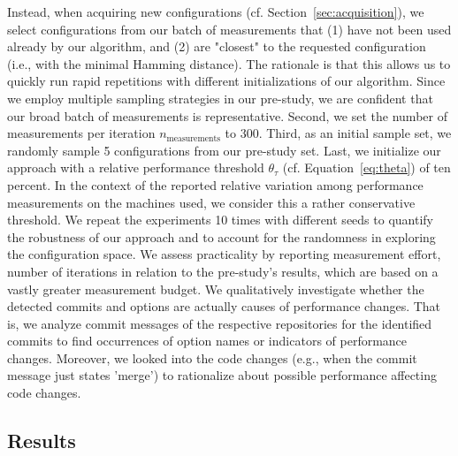 \documentclass[sigconf, screen]{acmart}
\begin{document}
	Instead, when acquiring new configurations (cf. Section~\ref{sec:acquisition}), we select configurations from our batch of measurements that (1) have not been used already by our algorithm, and (2) are "closest" to the requested configuration (i.e., with the minimal Hamming distance). The rationale is that this allows us to quickly run rapid repetitions with different initializations of our algorithm. Since we employ multiple sampling strategies in our pre-study, we are confident that our broad batch of measurements is representative. Second, we set the number of measurements per iteration $n_\text{measurements}$ to 300. Third, as an initial sample set, we randomly sample 5 configurations from our pre-study set. 
	Last, we initialize our approach with a relative performance threshold $\theta_\tau$ (cf. Equation~\ref{eq:theta}) of ten percent. In the context of the reported relative variation among performance measurements on the machines used, we consider this a rather conservative threshold. 
	We repeat the experiments 10 times with different seeds to quantify the robustness of our approach and to account for the randomness in exploring the configuration space.
	We assess practicality by reporting measurement effort, number of iterations in relation to the pre-study's results, which are based on a vastly greater measurement budget.
	We qualitatively investigate whether the detected commits and options are actually causes of performance changes. That is, we analyze commit messages of the respective repositories for the identified commits to find occurrences of option names or indicators of performance changes. Moreover, we looked into the code changes (e.g., when the commit message just states 'merge') to rationalize about possible performance affecting code changes.
	
	\subsection{Results}	
\end{document}
